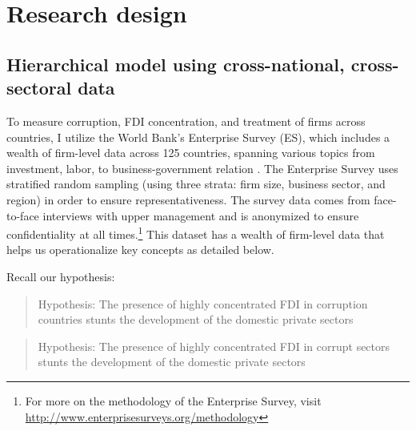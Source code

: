 \documentclass[12pt]{article}
\begin{document}
\section{Research design}

\subsection{Hierarchical model using cross-national, cross-sectoral data}

To measure corruption, FDI concentration, and treatment of firms across countries, I utilize the World Bank's Enterprise Survey (ES), which includes a wealth of firm-level data across 125 countries, spanning various topics from investment, labor, to business-government relation \citep{WorldBank2015}. The Enterprise Survey uses stratified random sampling (using three strata: firm size, business sector, and region) in order to ensure representativeness. The survey data comes from face-to-face interviews with upper management and is anonymized to ensure confidentiality at all times.\footnote{For more on the methodology of the Enterprise Survey, visit \url{http://www.enterprisesurveys.org/methodology}} This dataset has a wealth of firm-level data that helps us operationalize key concepts as detailed below.

Recall our hypothesis:

\begin{quote}
Hypothesis: The presence of highly concentrated FDI in corruption countries stunts the development of the domestic private sectors
\end{quote}

\begin{quote}
Hypothesis: The presence of highly concentrated FDI in corrupt sectors stunts the development of the domestic private sectors
\end{quote}
\end{document}

